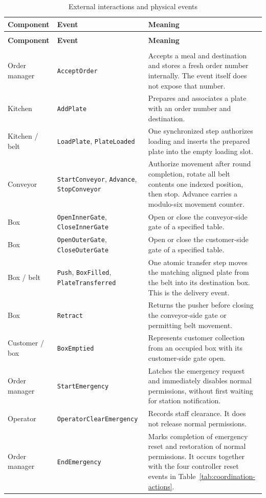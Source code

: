 \documentclass[11pt,a4paper]{article}
\renewcommand{\arraystretch}{1.14}
\begin{document}
\begingroup
\small
\setlength{\tabcolsep}{4pt}
\renewcommand{\arraystretch}{1.13}
\begin{longtable}{@{}>{\raggedright\arraybackslash}p{}>{\raggedright\arraybackslash}p{}>{\raggedright\arraybackslash}p{}@{}}
\caption{External interactions and physical events}\label{tab:actions}\\
\toprule
\textbf{Component} & \textbf{Event} & \textbf{Meaning} \\
\midrule
\endfirsthead
\multicolumn{3}{@{}l}{\small External interactions and physical events (continued)}\\
\toprule
\textbf{Component} & \textbf{Event} & \textbf{Meaning} \\
\midrule
\endhead
\midrule
\multicolumn{3}{r@{}}{\small Continued on next page}\\
\endfoot
\bottomrule
\endlastfoot
Order manager & \texttt{AcceptOrder} & Accepts a meal and destination and stores a fresh order number internally. The event itself does not expose that number. \\
Kitchen & \texttt{AddPlate} & Prepares and associates a plate with an order number and destination. \\
Kitchen / belt & \texttt{LoadPlate}, \texttt{PlateLoaded} & One synchronized step authorizes loading and inserts the prepared plate into the empty loading slot. \\
Conveyor & \texttt{StartConveyor}, \texttt{Advance}, \texttt{StopConveyor} & Authorize movement after round completion, rotate all belt contents one indexed position, then stop. Advance carries a modulo-six movement counter. \\
Box & \texttt{OpenInnerGate}, \texttt{CloseInnerGate} & Open or close the conveyor-side gate of a specified table. \\
Box & \texttt{OpenOuterGate}, \texttt{CloseOuterGate} & Open or close the customer-side gate of a specified table. \\
Box / belt & \texttt{Push}, \texttt{BoxFilled}, \texttt{PlateTransferred} & One atomic transfer step moves the matching aligned plate from the belt into its destination box. This is the delivery event. \\
Box & \texttt{Retract} & Returns the pusher before closing the conveyor-side gate or permitting belt movement. \\
Customer / box & \texttt{BoxEmptied} & Represents customer collection from an occupied box with its customer-side gate open. \\
Order manager & \texttt{StartEmergency} & Latches the emergency request and immediately disables normal permissions, without first waiting for station notification. \\
Operator & \texttt{OperatorClearEmergency} & Records staff clearance. It does not release normal permissions. \\
Order manager & \texttt{EndEmergency} & Marks completion of emergency reset and restoration of normal permissions. It occurs together with the four controller reset events in Table~\ref{tab:coordination-actions}. \\
\end{longtable}
\endgroup
\end{document}

